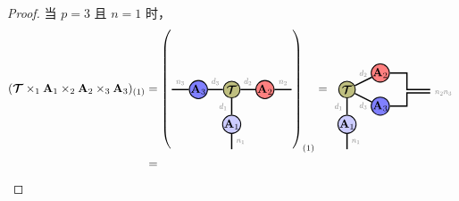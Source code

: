 \begin{proof}
当 $p =3$ 且 $n=1$ 时，
\begin{align*}
(\Tt\ttm1\Ab_1\ttm2\Ab_2\ttm3\Ab_3)_{(1)}
&= 
 \left(\begin{tikzpicture}[baseline=-0.5ex]
    \tikzset{tensor/.style = {minimum size = 0.5cm,shape = circle,thick,draw=black,inner sep = 0pt}, edge/.style = {thick,line width=.4mm},every loop/.style={}}
    \def\x{6}
    \node[tensor,fill=blue!20!white] (A1) at (\x,-1.05) {$\Ab_1$};
    \node[tensor,fill=green!50!red!50!white] (At) at (\x,0) {$\Tt$};
    \node[tensor,fill=red!50!white] (A2) at (\x+1,0) {$\Ab_2$};
    \node[tensor,fill=blue!50!white] (A3) at (\x-1,0) {$\Ab_3$};
    \draw[edge] (At) -- (A2) node [midway,above] {\scalebox{0.7}{\dimcolor{$d_2$}}};
    \draw[edge] (At) -- (A1) node [midway,left] {\scalebox{0.7}{\dimcolor{$d_1$}}};
    \draw[edge] (At) -- (A3) node [midway,above] {\scalebox{0.7}{\dimcolor{$d_3$}}};
    \draw[edge] (A1) -- (\x,-1.8) node [midway,right] {\scalebox{0.7}{\dimcolor{$n_1$}}};
    \draw[edge] (A2) -- (\x+1.8,0) node [midway,above] {\scalebox{0.7}{\dimcolor{$n_2$}}};
    \draw[edge] (A3) -- (\x-1.8,0) node [midway,above] {\scalebox{0.7}{\dimcolor{$n_3$}}};
    \end{tikzpicture}\right)_{(1)}
=
\begin{tikzpicture}[baseline=-0.5ex]
    \tikzset{tensor/.style = {minimum size = 0.5cm,shape = circle,thick,draw=black,inner sep = 0pt}, edge/.style = {thick,line width=.4mm},every loop/.style={}}
    \def\x{6}
    \def\y{0}
    \node[tensor,fill=blue!20!white] (A1) at (\x,-1.05) {$\Ab_1$};
    \node[tensor,fill=green!50!red!50!white] (At) at (\x,0) {$\Tt$};
    \node[tensor,fill=red!50!white] (A2) at (\x+1,\y+0.5) {$\Ab_2$};
    \node[tensor,fill=blue!50!white] (A3) at (\x+1,\y-0.5) {$\Ab_3$};
    \draw[edge] (At) -- (A1) node [midway,left] {\scalebox{0.7}{\dimcolor{$d_1$}}};
    \draw[edge] (At) -- (A3) node [midway,below] {\scalebox{0.7}{\dimcolor{$d_3$}}};
    \draw[edge] (At) -- (A2) node [midway,above] {\scalebox{0.7}{\dimcolor{$d_2$}}};
    \draw[edge] (A1) -- (\x,-1.8) node [midway,right] {\scalebox{0.7}{\dimcolor{$n_1$}}};
    \draw[edge] (A2) -- (\x+1.8,\y+0.5) -- (\x+1.8,\y)-- (\x+2.5,\y);
    \draw[edge] (A3) -- (\x+1.8,\y-0.5) -- (\x+1.8,\y-0.1) -- (\x+2.5,\y-0.1)node [right] {\scalebox{0.7}{\dimcolor{$n_2n_3$}}};
    \end{tikzpicture}\\
&=
\begin{tikzpicture}[baseline=-0.5ex]
    \tikzset{tensor/.style = {minimum size = 0.5cm,shape = circle,thick,draw=black,inner sep = 0pt}, edge/.style = {thick,line width=.4mm},every loop/.style={}}

\end{tikzpicture}
\end{align*}
\end{proof}
